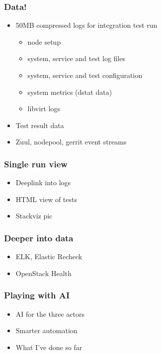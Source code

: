\documentclass[aspectratio=169,11pt,hyperref={colorlinks=true}]{beamer}
\begin{document}

\begin{frame}
    \frametitle{Data!}
    \begin{itemize}
        \item{50MB compressed logs for integration test run}
        \begin{itemize}
            \item{node setup}
            \item{system, service and test log files}
            \item{system, service and test configuration}
            \item{system metrics (dstat data)}
            \item{libvirt logs}
        \end{itemize}
        \item{Test result data}
        \item{Zuul, nodepool, gerrit event streams}
    \end{itemize}
\end{frame}


\begin{frame}
    \frametitle{Single run view}
    \begin{itemize}
        \item{Deeplink into logs}
        \item{HTML view of tests}
        \item{Stackviz pic}
    \end{itemize}
\end{frame}


\begin{frame}
    \frametitle{Deeper into data}
    \begin{itemize}
        \item{ELK, Elastic Recheck}
        \item{OpenStack Health}
    \end{itemize}
\end{frame}

\begin{frame}
    \frametitle{Playing with AI}
    \begin{itemize}
        \item{AI for the three actors}
        \item{Smarter automation}
        \item{What I've done so far}
    \end{itemize}
\end{frame}
\end{document}
